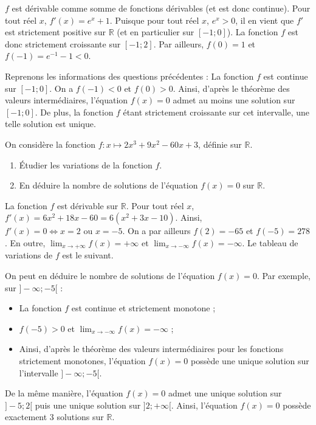 \documentclass[11pt,fleqn, openany]{book} %
\begin{document}
\begin{solution}
 $f$ est dérivable comme somme de fonctions dérivables (et est donc continue). Pour tout réel $x$, $f'(x)=e^x+1$. Puisque pour tout réel $x$, $e^x>0$, il en vient que $f'$ est strictement positive sur $\mathbb{R}$ (et en particulier sur $[-1;0]$). La fonction $f$ est donc strictement croissante sur $[-1;2]$. Par ailleurs, $f(0)=1$ et $f(-1)=e^{-1}-1<0$.
 
Reprenons les informations des questions précédentes :
La fonction $f$ est continue sur $[-1;0]$. On a $f(-1)<0$ et $f(0)>0$. Ainsi, d'après le théorème des valeurs intermédiaires, l'équation $f(x)=0$ admet au moins une solution sur $[-1;0]$. De plus, la fonction $f$ étant strictement croissante sur cet intervalle, une telle solution est unique.\end{solution}




\begin{exercise} On considère la fonction $f:x \mapsto 2x^3+9x^2-60x+3$, définie sur $\mathbb{R}$.
\begin{enumerate}
\item Étudier les variations de la fonction $f$.
\item En déduire la nombre de solutions de l'équation $f(x)=0$ sur $\mathbb{R}$.
\end{enumerate}\end{exercise}

\begin{solution}La fonction $f$ est dérivable sur $\mathbb{R}$. Pour tout réel $x$,  $f'(x)=6x^2+18x-60=6(x^2+3x-10)$. Ainsi, $f'(x)=0 \Leftrightarrow x=2 \text{ ou } x=-5$. On a par ailleurs $f(2)=-65$ et $f(-5)=278$. En outre, $\displaystyle\lim_{x \to +\infty} f(x)=+\infty$ et $\displaystyle \lim_{x \to -\infty} f(x)=-\infty$. Le tableau de variations de $f$ est le suivant.

\begin{center}
\end{center}

On peut en déduire le nombre de solutions de l'équation $f(x)=0$. Par exemple, sur $]-\infty ;-5[$ :
\begin{itemize}
\item La fonction $f$ est continue et strictement monotone ;
\item $f(-5)>0$ et $\displaystyle\lim_{x \to -\infty} f(x)=-\infty$ ;
\item Ainsi, d'après le théorème des valeurs intermédiaires pour les fonctions strictement monotones, l'équation $f(x)=0$ possède une unique solution sur l'intervalle $]-\infty ; -5[$.
\end{itemize}
De la même manière, l'équation $f(x)=0$ admet une unique solution sur $]-5;2[$ puis une unique solution sur $]2;+\infty[$. Ainsi, l'équation $f(x)=0$ possède exactement 3 solutions sur $\mathbb{R}$.\end{solution}
\end{document}
